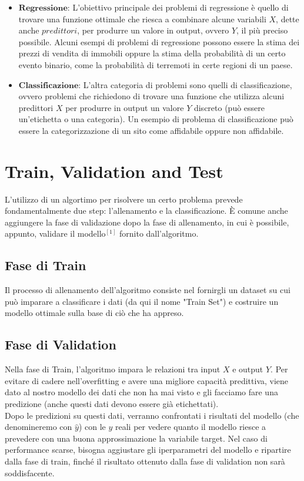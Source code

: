 		\begin{itemize}
			\item $\textbf{Regressione:}$ L'obiettivo principale dei problemi di regressione è quello di trovare una funzione ottimale che riesca a combinare alcune variabili $X$, dette anche $\textit{predittori}$, per produrre un valore in output, ovvero $Y$, il più preciso possibile.
				Alcuni esempi di problemi di regressione possono essere la stima dei prezzi di vendita di immobili oppure la stima della probabilità di un certo evento binario, come la probabilità di terremoti in certe regioni di un paese.
				\\[2\baselineskip]
			
			\item $\textbf{Classificazione:}$ L'altra categoria di problemi sono quelli di classificazione, ovvero problemi che richiedono di trovare una funzione che utilizza alcuni predittori $X$ per produrre in output un valore $Y$ discreto (può essere un'etichetta o una categoria).
			Un esempio di problema di classificazione può essere la categorizzazione di un sito come affidabile oppure non affidabile.
		\end{itemize}

	\clearpage

	\section{Train, Validation and Test}

		L'utilizzo di un algortimo per risolvere un certo problema prevede fondamentalmente due step: l'allenamento e la classificazione.
		È comune anche aggiungere la fase di validazione dopo la fase di allenamento, in cui è possibile, appunto, validare il modello$^{[1]}$ fornito dall'algoritmo.

			\subsection{Fase di Train}
			Il processo di allenamento dell'algoritmo consiste nel fornirgli un dataset su cui può imparare a classificare i dati (da qui il nome "Train Set") e costruire un modello ottimale sulla base di ciò che ha appreso.

			\subsection{Fase di Validation}
			Nella fase di Train, l'algoritmo impara le relazioni tra input $X$ e output $Y$.
			Per evitare di cadere nell'overfitting e avere una migliore capacità predittiva, viene dato al nostro modello dei dati che non ha mai visto e gli facciamo fare una predizione (anche questi dati devono essere già etichettati).
			\\[1\baselineskip]
			Dopo le predizioni su questi dati, verranno confrontati i risultati del modello (che denomineremo con $\hat{y}$) con le $y$ reali per vedere quanto il modello riesce a prevedere con una buona approssimazione la variabile target.
			Nel caso di performance scarse, bisogna aggiustare gli iperparametri del modello e ripartire dalla fase di train, finché il risultato ottenuto dalla fase di validation non sarà soddisfacente.
			
